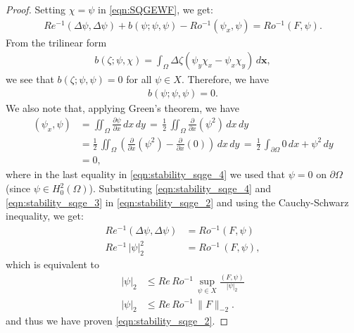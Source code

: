\begin{proof}
Setting $\chi = \psi$ in \eqref{eqn:SQGEWF}, we get:
\begin{align}
  Re^{-1} (\Delta \psi, \Delta \psi) + b(\psi;\psi, \psi) - Ro^{-1}(\psi_x, \psi)
    = Ro^{-1} (F,\psi) .
\label{eqn:stability_sqge_2}
\end{align}
From the trilinear form
\begin{align*}
  b(\zeta; \psi, \chi) = \int_{\Omega}\! \Delta \zeta \left(\psi_y \chi_x -
  \psi_x \chi_y\right)\, d\mathbf{x},
\end{align*}
we see that $b(\zeta; \psi, \psi) = 0$ for all $\psi \in X$. Therefore, we have
\begin{align}
  b(\psi;\psi, \psi) = 0 .
  \label{eqn:stability_sqge_3}
\end{align}
We also note that, applying Green's theorem, we have
\begin{align}
  (\psi_x,\psi) &= \iint_{\Omega} \frac{\partial \psi}{\partial x} \, dx \, dy
    \, = \, \frac{1}{2} \, \iint_{\Omega} \frac{\partial}{\partial x} (\psi^2) \, dx \, dy \nonumber \\
  &= \frac{1}{2} \, \iint_{\Omega} \left( \frac{\partial}{\partial x} (\psi^2)
    - \frac{\partial}{\partial x} (0) \right) \, dx \, dy
    \, = \,  \frac{1}{2} \, \int_{\partial \Omega} 0 \, dx + \psi^2 \, dy \nonumber \\
  &= 0 ,
\label{eqn:stability_sqge_4}
\end{align}
where in the last equality in \eqref{eqn:stability_sqge_4} we used that $\psi =
0$ on $\partial \Omega$ (since $\psi \in H_0^2(\Omega)$).  Substituting
\eqref{eqn:stability_sqge_4} and \eqref{eqn:stability_sqge_3} in
\eqref{eqn:stability_sqge_2} and using the Cauchy-Schwarz inequality, we get:
\begin{align}
  Re^{-1} (\Delta \psi, \Delta \psi) &= Ro^{-1} (F,\psi) \nonumber \\
  Re^{-1}\, |\psi|_2^2 &= Ro^{-1}\, (F,\psi),
\end{align}
which is equivalent to
\begin{align}
  |\psi|_2 &\le Re\, Ro^{-1}\,\sup_{\psi \in X} \frac{(F,\psi)}{|\psi|_2} \nonumber \\
  |\psi|_2 &\le Re\, Ro^{-1}\, \|F\|_{-2}.
  \label{eqn:stability_sqge_5}
\end{align}
and thus we have proven \eqref{eqn:stability_sqge_2}.
\end{proof}
